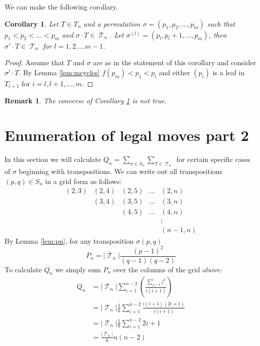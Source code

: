 \documentclass[10pt]{amsart} %
\newtheorem{remk}{Remark}
\newtheorem{corol}{Corollary}
\theoremstyle{definition}
\DeclareMathOperator{\T}{\mathcal{T}}
\begin{document}
 We can make the following corollary.  


\begin{corol}\label{cor:subsig}
 Let $T \in T_n$ and a permutation $ \sigma  = (p_1,p_2,\dots,p_m)$ such that $p_1 < p_2 < \dots <  p_m$ and $\sigma \cdot T \in \T_n$.  Let $\sigma^{(l)} = (p_l,p_l+1,\dots,p_m)$, then $\sigma' \cdot T \in \T_n$ for $l = 1,2,\dots m-1$.
\end{corol}
\begin{proof}
 Assume that $T$ and $\sigma$ are as in the statement of this corollary and consider $\sigma^{l} \cdot T$.  By Lemma \ref{lem:mcycles} $f(p_m) < p_1 < p_l$ and either $(p_i)$ is a leaf in $T_{i+1}$ for $i = l,l+1,\dots,m$.       
\end{proof}

\begin{remk}
 The converse of Corollary \ref{cor:subsig} is not true.  %
\end{remk}

\section{Enumeration of legal moves part 2}
In this section we will calculate $Q_n = \sum_{\sigma \in S_n}\sum_{T \in \T_n}$ for certain specific cases of $\sigma$ beginning with transpositions.  We can write out all transpositions $(p,q) \in S_n$ in a grid form as follows:
 \[ \begin{array}{c|c|c|c|c}
     (2,3)  & (2,4)  & (2,5) & \dots & (2,n) \\
       & (3,4)  & (3,5) & \dots &(3,n) \\
       &        &  (4,5) & \dots & (4,n) \\
       &&&& \vdots \\
       &&&&(n-1,n)
    \end{array} 
\]
By Lemma \ref{lem:pn}, for any transposition $\sigma(p,q)$ 
\[P_n = \lvert \T_n\rvert\frac{(p-1)^{2}}{(q-1)(q-2)}\]
To calculate $Q_n$ we simply sum $P_n$ over the columns of the grid above:  
\begin{align*}
 Q_{n} &= \lvert \T_n\rvert\sum_{i=1}^{n-2} \left( \frac{ \sum_{j=1}^{i} j^2}{i(i+1)} \right) \\
 &= \lvert \T_n\rvert\frac{1}{6} \sum_{i=1}^{n-2} \frac{i(i+1)(2i +1)}{i(i+1)}\\
 &= \lvert \T_n\rvert\frac{1}{6} \sum_{i=1}^{n-2} 2i +1 \\
 & = \frac{\lvert \T_n\rvert}{6} n(n-2) 
\end{align*}
\end{document}
